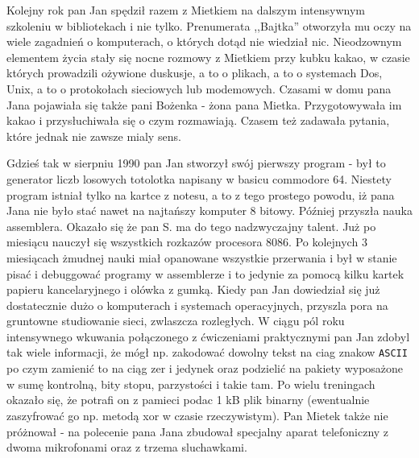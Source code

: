 \documentclass[a4paper,polish,titlepage,12pt]{article}
\begin{document}
Kolejny rok pan Jan spędził razem z Mietkiem na dalszym intensywnym szkoleniu w bibliotekach i nie tylko. Prenumerata ,,Bajtka'' otworzyła mu oczy na wiele zagadnień o
komputerach, o których dotąd nie wiedział nic. Nieodzownym elementem życia stały się nocne rozmowy z Mietkiem przy kubku kakao, w czasie których prowadzili ożywione duskusje,
a to o plikach, a to o systemach Dos, Unix, a to o protokołach sieciowych lub modemowych. Czasami w domu pana Jana pojawiała się także pani Bożenka - żona pana Mietka.
Przygotowywała im kakao i przysłuchiwała się o czym rozmawiają. Czasem też zadawała pytania, które jednak nie zawsze mialy sens.

Gdzieś tak w sierpniu 1990 pan Jan stworzył swój pierwszy program - był to generator liczb losowych totolotka napisany w basicu commodore 64. Niestety program istniał tylko
na kartce z notesu, a to z tego prostego powodu, iż pana Jana nie było stać nawet na najtańszy komputer 8 bitowy. Później przyszła nauka assemblera. Okazało się że pan S. ma
do tego nadzwyczajny talent. Już po miesiącu nauczył się wszystkich rozkazów procesora 8086. Po kolejnych 3 miesiącach żmudnej nauki miał opanowane wszystkie przerwania i był
w stanie pisać i debuggować programy w assemblerze i to jedynie za pomocą kilku kartek papieru kancelaryjnego i olówka z gumką. Kiedy pan Jan dowiedział się już dostatecznie
dużo o komputerach i systemach operacyjnych, przyszla pora na gruntowne studiowanie sieci, zwlaszcza rozległych. W ciągu pól roku intensywnego wkuwania połączonego z
ćwiczeniami praktycznymi pan Jan zdobyl tak wiele informacji, że mógł np. zakodować dowolny tekst na ciag znakow \verb+ASCII+ po czym zamienić to na ciąg zer i jedynek oraz
podzielić na pakiety wyposażone w sumę kontrolną, bity stopu, parzystości i takie tam. Po wielu treningach okazało się, że potrafi on z pamieci podac 1 kB plik binarny
(ewentualnie zaszyfrować go np. metodą xor w czasie rzeczywistym). Pan Mietek także nie próżnował - na polecenie pana Jana zbudował specjalny aparat telefoniczny z dwoma
mikrofonami oraz z trzema sluchawkami.
\end{document}
